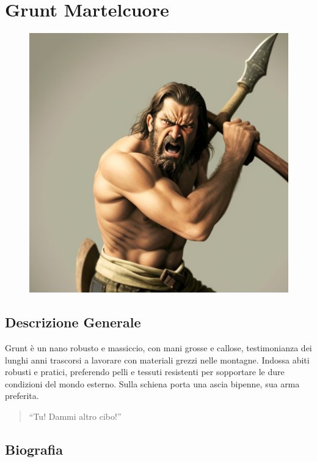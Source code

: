 \section{Grunt Martelcuore}\label{grunt-martelcuore}


\begin{figure}
\centering
\includegraphics{an-angry-man-with-a-double-axe.png}
\end{figure}

\subsection{Descrizione Generale}\label{descrizione-generale}


Grunt è un nano robusto e massiccio, con mani grosse e callose,
testimonianza dei lunghi anni trascorsi a lavorare con materiali grezzi
nelle montagne. Indossa abiti robusti e pratici, preferendo pelli e
tessuti resistenti per sopportare le dure condizioni del mondo esterno.
Sulla schiena porta una ascia bipenne, sua arma preferita.

\begin{quote}
``Tu! Dammi altro cibo!''
\end{quote}

\subsection{Biografia}\label{biografia}


